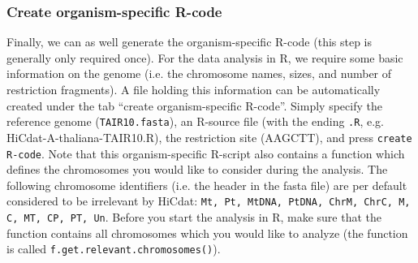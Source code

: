 \documentclass[a4paper,10pt]{article}
\begin{document}
\subsubsection{Create organism-specific R-code}
Finally, we can as well generate the organism-specific R-code (this step is generally only required once). For the data analysis in R, we require some basic information on the genome (i.e. the chromosome names, sizes, and number of restriction fragments). A file holding this information can be automatically created under the tab ``create organism-specific R-code''. Simply specify the reference genome (\texttt{TAIR10.fasta}), an R-source file (with the ending \texttt{.R}, e.g. HiCdat-A-thaliana-TAIR10.R), the restriction site (AAGCTT), and press \texttt{create R-code}. Note that this organism-specific R-script also contains a function which defines the chromosomes you would like to consider during the analysis. The following chromosome identifiers (i.e. the header in the fasta file) are per default considered to be irrelevant by HiCdat: \texttt{Mt, Pt, MtDNA, PtDNA, ChrM, ChrC, M, C, MT, CP, PT, Un}. Before you start the analysis in R, make sure that the function contains all chromosomes which you would like to analyze (the function is called \texttt{f.get.relevant.chromosomes()}).
\clearpage
\end{document}

